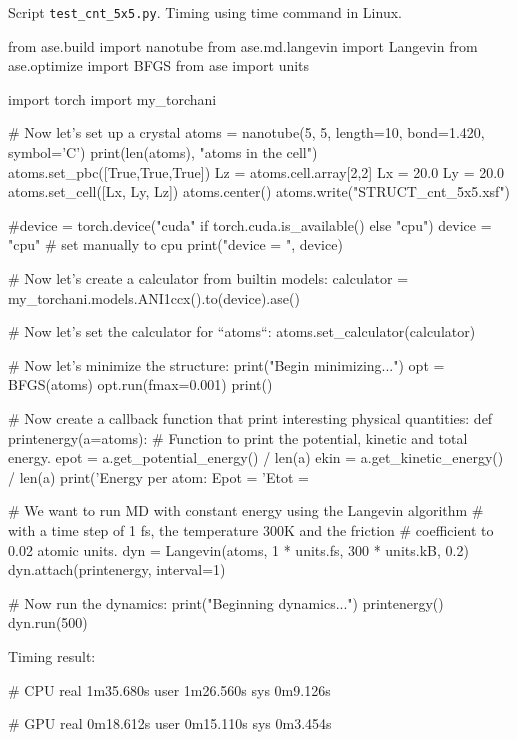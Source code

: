 \documentclass[a4paper,12pt]{article} %
\newcommand{\txtinline}[1]{\texttt{#1}}
\begin{document}
Script \txtinline{test_cnt_5x5.py}. Timing using time command in Linux.
\begin{pythoncode}
from ase.build import nanotube
from ase.md.langevin import Langevin
from ase.optimize import BFGS
from ase import units

import torch
import my_torchani

# Now let's set up a crystal
atoms = nanotube(5, 5, length=10, bond=1.420, symbol='C')
print(len(atoms), "atoms in the cell")
atoms.set_pbc([True,True,True])
Lz = atoms.cell.array[2,2]
Lx = 20.0
Ly = 20.0
atoms.set_cell([Lx, Ly, Lz])
atoms.center()
atoms.write("STRUCT_cnt_5x5.xsf")
    
#device = torch.device("cuda" if torch.cuda.is_available() else "cpu")
device = "cpu" # set manually to cpu
print("device = ", device)
    
# Now let's create a calculator from builtin models:
calculator = my_torchani.models.ANI1ccx().to(device).ase()
    
# Now let's set the calculator for ``atoms``:
atoms.set_calculator(calculator)
    
# Now let's minimize the structure:
print("Begin minimizing...")
opt = BFGS(atoms)
opt.run(fmax=0.001)
print()
    
    
# Now create a callback function that print interesting physical quantities:
def printenergy(a=atoms):
    # Function to print the potential, kinetic and total energy.
    epot = a.get_potential_energy() / len(a)
    ekin = a.get_kinetic_energy() / len(a)
    print('Energy per atom: Epot = %
          'Etot = %

# We want to run MD with constant energy using the Langevin algorithm
# with a time step of 1 fs, the temperature 300K and the friction
# coefficient to 0.02 atomic units.
dyn = Langevin(atoms, 1 * units.fs, 300 * units.kB, 0.2)
dyn.attach(printenergy, interval=1)

# Now run the dynamics:
print("Beginning dynamics...")
printenergy()
dyn.run(500)    
\end{pythoncode}

Timing result:
\begin{textcode}
# CPU
real	1m35.680s
user	1m26.560s
sys	0m9.126s
    
# GPU
real	0m18.612s
user	0m15.110s
sys	0m3.454s
\end{textcode}




\end{document}
